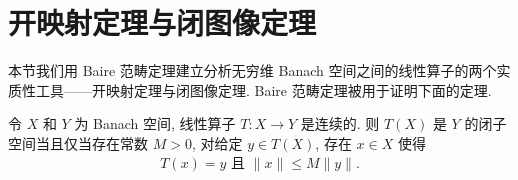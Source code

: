 \documentclass[../../main.tex]{subfiles}
\begin{document}
\section{开映射定理与闭图像定理}\label{section:ch13-开映射闭图像}

本节我们用 Baire 范畴定理建立分析无穷维 Banach 空间之间的线性算子的两个实质性工具——开映射定理与闭图像定理. Baire 范畴定理被用于证明下面的定理.

\begin{theorem}\label{theorem:ch13-象闭判据}
令 $X$ 和 $Y$ 为 Banach 空间, 线性算子 $T:X\to Y$ 是连续的. 则 $T(X)$ 是 $Y$ 的闭子空间当且仅当存在常数 $M>0$, 对给定 $y\in T(X)$, 存在 $x\in X$ 使得
\begin{align}
T(x)=y\text{ 且 }\|x\|\leqslant M\|y\|.\label{align:ch13-象闭判据}
\end{align}
\end{theorem}
\end{document}
